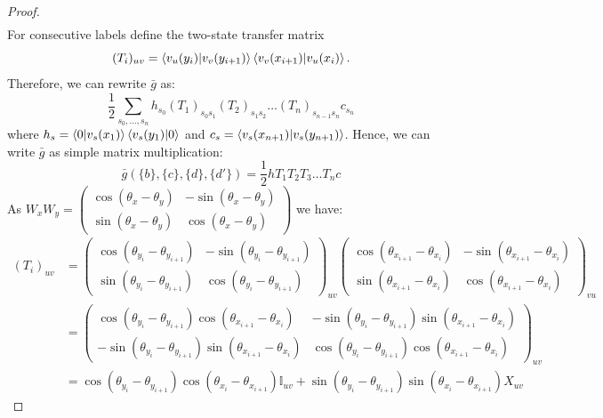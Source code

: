 \documentclass[aps,floatfix,10pt,amssymb,amsfont,amsmath,superscriptaddress,float,nofootinbib,longbibliography,nobalancelastpage,twocolumn]{revtex4-2}
\begin{document}
\begin{widetext}
\begin{proof}
\begin{multline}
\end{multline}
For consecutive labels define
the two-state transfer matrix
\begin{equation*}
    (T_i)_{uv}=\braket{v_u(y_i)|v_v(y_{i+1})}
    \braket{v_v(x_{i+1})|v_u(x_i)}.
\end{equation*}
Therefore, we can rewrite $\bar g$ as:
\begin{equation}
   \frac{1}{2}\sum_{s_0,\ldots,s_n} h_{s_0}(T_1)_{s_0s_1}(T_2)_{s_1s_2}\ldots (T_n)_{s_{n-1}s_{n}} c_{s_n}
\end{equation}
where $h_s = \braket{0|v_{s}(x_1)}\braket{v_{s}(y_1)|0}$ and $c_s =\braket{v_{s}(x_{n+1})|v_{s}(y_{n+1})}$. Hence, we can write $\bar g$ as simple matrix multiplication:
\begin{equation}
    \bar g(\{b\},\{c\},\{d\},\{d'\}) = \frac{1}{2}hT_1T_2T_3\ldots T_nc
\end{equation}
As $W_xW_y = \begin{pmatrix}
    \cos (\theta_x - \theta_y) & - \sin (\theta_x - \theta_y)\\
     \sin (\theta_x - \theta_y) & \cos (\theta_x - \theta_y)
\end{pmatrix}$ we have:
\begin{align}
    (T_i)_{u v} &=  \begin{pmatrix}
    \cos (\theta_{y_i} - \theta_{y_{i+1}}) & - \sin (\theta_{y_i} - \theta_{y_{i+1}})\\
     \sin (\theta_{y_i} - \theta_{y_{i+1}}) & \cos (\theta_{y_i} - \theta_{y_{i+1}})
\end{pmatrix}_{uv} \begin{pmatrix}
    \cos (\theta_{x_{i+1}} - \theta_{x_{i}}) & - \sin (\theta_{x_{i+1}} - \theta_{x_{i}})\\
     \sin (\theta_{x_{i+1}} - \theta_{x_{i}}) & \cos (\theta_{x_{i+1}} - \theta_{x_{i}}) 
\end{pmatrix}_{vu}\\
&=\begin{pmatrix}
    \cos (\theta_{y_i} - \theta_{y_{i+1}})\cos (\theta_{x_{i+1}} - \theta_{x_{i}}) & - \sin (\theta_{y_i} - \theta_{y_{i+1}})\sin (\theta_{x_{i+1}} - \theta_{x_{i}})\\
     -\sin (\theta_{y_i} - \theta_{y_{i+1}})\sin (\theta_{x_{i+1}} - \theta_{x_{i}}) & \cos (\theta_{y_i} - \theta_{y_{i+1}}) \cos (\theta_{x_{i+1}} - \theta_{x_{i}}) 
\end{pmatrix}_{uv}\\
&=  \cos (\theta_{y_i} - \theta_{y_{i+1}})\cos (\theta_{x_{i}} - \theta_{x_{i+1}}) \mathbb{I}_{uv} + \sin (\theta_{y_i} - \theta_{y_{i+1}})\sin (\theta_{x_{i}} - \theta_{x_{i+1}}) X_{uv}

\end{align}
\end{proof}
\end{widetext}
\end{document}
